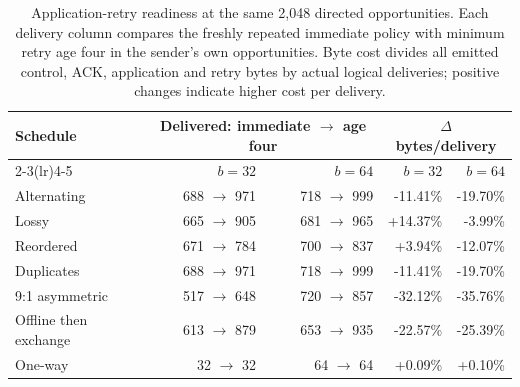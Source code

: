 \begin{table}[t]
\centering
\small
\setlength{\tabcolsep}{3.5pt}
\begin{tabular}{@{}lrrrr@{}}
\toprule
Schedule & \multicolumn{2}{c}{Delivered: immediate $\to$ age four} & \multicolumn{2}{c}{$\Delta$ bytes/delivery}\\
\cmidrule(lr){2-3}\cmidrule(lr){4-5}
 & $b=32$ & $b=64$ & $b=32$ & $b=64$\\
\midrule
Alternating & 688 $\to$ 971 & 718 $\to$ 999 & -11.41\% & -19.70\%\\
Lossy & 665 $\to$ 905 & 681 $\to$ 965 & +14.37\% & -3.99\%\\
Reordered & 671 $\to$ 784 & 700 $\to$ 837 & +3.94\% & -12.07\%\\
Duplicates & 688 $\to$ 971 & 718 $\to$ 999 & -11.41\% & -19.70\%\\
9:1 asymmetric & 517 $\to$ 648 & 720 $\to$ 857 & -32.12\% & -35.76\%\\
Offline then exchange & 613 $\to$ 879 & 653 $\to$ 935 & -22.57\% & -25.39\%\\
One-way & 32 $\to$ 32 & 64 $\to$ 64 & +0.09\% & +0.10\%\\
\bottomrule
\end{tabular}
\caption{Application-retry readiness at the same 2,048 directed opportunities. Each delivery column compares the freshly repeated immediate policy with minimum retry age four in the sender's own opportunities. Byte cost divides all emitted control, ACK, application and retry bytes by actual logical deliveries; positive changes indicate higher cost per delivery.}
\label{tab:retry-readiness}
\end{table}

